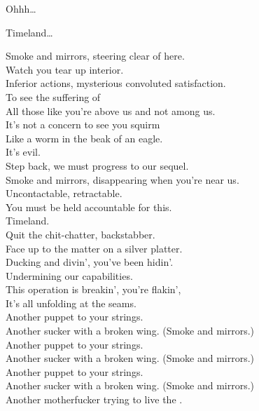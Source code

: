 
\label{album:made-in-timeland}




Ohhh…

Timeland… \\





Smoke and mirrors, steering clear of here. \\
Watch you tear up interior. \\
Inferior actions, mysterious convoluted satisfaction. \\
To see the suffering of \\
All those like you're above us and not among us. \\
It's not a concern to see you squirm \\
Like a worm in the beak of an eagle. \\
It's evil. \\
Step back, we must progress to our sequel. \\

Smoke and mirrors, disappearing when you're near us. \\
Uncontactable, retractable. \\
You must be held accountable for this. \\

Timeland. \\

Quit the chit-chatter, backstabber. \\
Face up to the matter on a silver platter. \\
Ducking and divin', you've been hidin'. \\
Undermining our capabilities. \\
This operation is breakin', you're flakin', \\
It's all unfolding at the seams. \\

Another puppet to your strings. \\
Another sucker with a broken wing. (Smoke and mirrors.) \\
Another puppet to your strings. \\
Another sucker with a broken wing. (Smoke and mirrors.) \\
Another puppet to your strings. \\
Another sucker with a broken wing. (Smoke and mirrors.) \\
Another motherfucker trying to live the . \\
